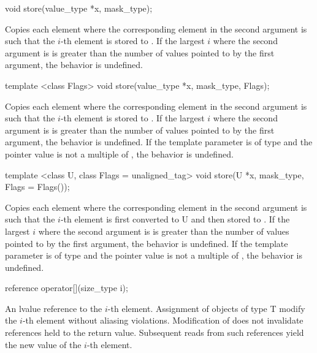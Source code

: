 \begin{itemdecl}
void store(value_type *x, mask_type);
\end{itemdecl}
\begin{itemdescr}
  \pnum\effects Copies each element where the corresponding element in the second argument is \true such that the $i$-th element is stored to .
  \pnum\remarks If the largest $i$ where the second argument is \true is greater than the number of values pointed to by the first argument, the behavior is undefined.
\end{itemdescr}

\begin{itemdecl}
template <class Flags> void store(value_type *x, mask_type, Flags);
\end{itemdecl}
\begin{itemdescr}
  \pnum\effects Copies each element where the corresponding element in the second argument is \true such that the $i$-th element is stored to .
  \pnum\remarks If the largest $i$ where the second argument is \true is greater than the number of values pointed to by the first argument, the behavior is undefined.
  \pnum\remarks If the template parameter is of type  and the pointer value is not a multiple of , the behavior is undefined.
\end{itemdescr}

\begin{itemdecl}
template <class U, class Flags = unaligned_tag> void store(U *x, mask_type, Flags = Flags());
\end{itemdecl}
\begin{itemdescr}
  \pnum\effects Copies each element where the corresponding element in the second argument is \true such that the $i$-th element is first converted to \type U and then stored to .
  \pnum\remarks If the largest $i$ where the second argument is \true is greater than the number of values pointed to by the first argument, the behavior is undefined.
  \pnum\remarks If the template parameter is of type  and the pointer value is not a multiple of , the behavior is undefined.
\end{itemdescr}

\begin{itemdecl}
reference operator[](size_type i);
\end{itemdecl}
\begin{itemdescr}
  \pnum\returns An lvalue reference to the $i$-th element.
  \pnum\postconditions Assignment of objects of type \type T modify the $i$-th element without aliasing violations.
  \pnum                Modification of  does not invalidate references held to the return value.
  Subsequent reads from such references yield the new value of the $i$-th element.
\end{itemdescr}

